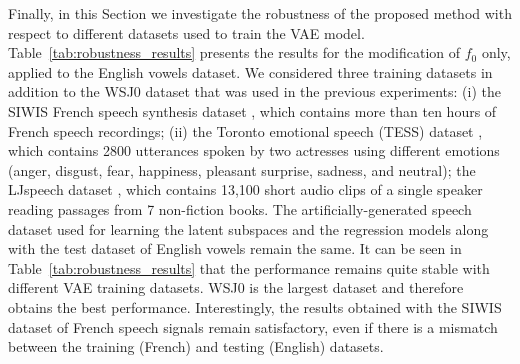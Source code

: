 \documentclass[review]{elsarticle}
\begin{document}
Finally, in this Section we investigate the robustness of the proposed method with respect to different datasets used to train the VAE model. Table~\ref{tab:robustness_results} presents the results for the modification of $f_0$ only, applied to the English vowels dataset. We considered three training datasets in addition to the WSJ0 dataset that was used in the previous experiments: (i) the SIWIS French speech synthesis dataset \citep{honnet2017siwis}, which contains 
more than ten hours of French speech recordings; (ii) the Toronto emotional speech (TESS) dataset \citep{dupuis2010toronto}, which contains 2800 utterances spoken by two actresses using different emotions (anger, disgust, fear, happiness, pleasant surprise, sadness, and neutral); the LJspeech dataset \citep{ljspeech17}, which contains 13,100 short audio clips of a single speaker reading passages from 7 non-fiction books. The artificially-generated speech dataset used for learning the latent subspaces and the regression models along with the test dataset of English vowels remain the same. It can be seen in Table~\ref{tab:robustness_results} that the performance remains quite stable with different VAE training datasets. WSJ0 is the largest dataset and therefore obtains the best performance. Interestingly, the results obtained with the SIWIS dataset of French speech signals remain satisfactory, even if there is a mismatch between the training (French) and testing (English) datasets.


\begin{table}
\centering
{}
\caption{Performance (mean and standard deviation) of $f_0$ transformation with the proposed method, on the English vowels test dataset, using different training datasets for the unsupervised VAE model.}
\label{tab:robustness_results}
\end{table}
\end{document}
